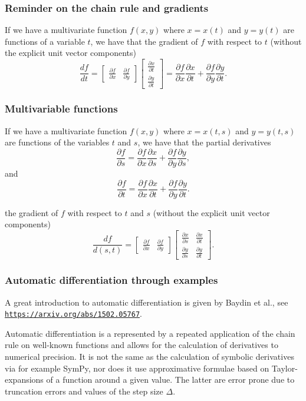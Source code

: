 \documentclass{beamer}
\begin{document}
\begin{frame}
\frametitle{Reminder on the chain rule and gradients}

If we have a multivariate function $f(x,y)$ where $x=x(t)$ and $y=y(t)$ are functions of a variable $t$, we have that the gradient of $f$ with respect to $t$ (without the explicit unit vector components)
\[
\frac{df}{dt} = \begin{bmatrix}\frac{\partial f}{\partial x} & \frac{\partial f}{\partial y} \end{bmatrix} \begin{bmatrix}\frac{\partial x}{\partial t} \\ \frac{\partial y}{\partial t} \end{bmatrix}=\frac{\partial f}{\partial x} \frac{\partial x}{\partial t} +\frac{\partial f}{\partial y} \frac{\partial y}{\partial t}. 
\]
\end{frame}

\begin{frame}
\frametitle{Multivariable functions}

If we have a multivariate function $f(x,y)$ where $x=x(t,s)$ and $y=y(t,s)$ are functions of the variables $t$ and $s$, we have that the partial derivatives
\[
\frac{\partial f}{\partial s}=\frac{\partial f}{\partial x}\frac{\partial x}{\partial s}+\frac{\partial f}{\partial y}\frac{\partial y}{\partial s},
\]
and
\[
\frac{\partial f}{\partial t}=\frac{\partial f}{\partial x}\frac{\partial x}{\partial t}+\frac{\partial f}{\partial y}\frac{\partial y}{\partial t}.
\]

the gradient of $f$ with respect to $t$ and $s$ (without the explicit unit vector components)
\[
\frac{df}{d(s,t)} = \begin{bmatrix}\frac{\partial f}{\partial x} & \frac{\partial f}{\partial y} \end{bmatrix} \begin{bmatrix}\frac{\partial x}{\partial s}  &\frac{\partial x}{\partial t} \\ \frac{\partial y}{\partial s} & \frac{\partial y}{\partial t} \end{bmatrix}.
\]
\end{frame}

\begin{frame}
\frametitle{Automatic differentiation through examples}

A great introduction to automatic differentiation is given by Baydin et al., see \href{{https://arxiv.org/abs/1502.05767}}{\nolinkurl{https://arxiv.org/abs/1502.05767}}.

Automatic differentiation is a represented by a repeated application
of the chain rule on well-known functions and allows for the
calculation of derivatives to numerical precision. It is not the same
as the calculation of symbolic derivatives via for example SymPy, nor
does it use approximative formulae based on Taylor-expansions of a
function around a given value. The latter are error prone due to
truncation errors and values of the step size $\Delta$.
\end{frame}
\end{document}
